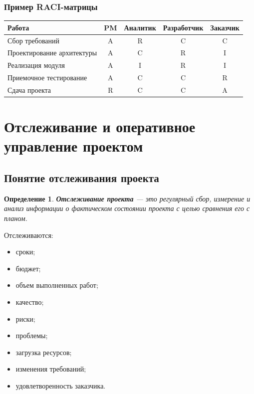 \documentclass[12pt,a4paper]{article}
\newtheorem{definition}{Определение}
\begin{document}
\subsubsection*{Пример RACI-матрицы}

\begin{center}
\begin{tabular}{|p{4cm}|c|c|c|c|}
\hline
\textbf{Работа} & \textbf{PM} & \textbf{Аналитик} & \textbf{Разработчик} & \textbf{Заказчик} \\
\hline
Сбор требований & A & R & C & C \\
\hline
Проектирование архитектуры & A & C & R & I \\
\hline
Реализация модуля & A & I & R & I \\
\hline
Приемочное тестирование & A & C & C & R \\
\hline
Сдача проекта & R & C & C & A \\
\hline
\end{tabular}
\end{center}

\section{Отслеживание и оперативное управление проектом}

\subsection{Понятие отслеживания проекта}

\begin{definition}
\textbf{Отслеживание проекта} --- это регулярный сбор, измерение и анализ информации о фактическом состоянии проекта с целью сравнения его с планом.
\end{definition}

Отслеживаются:
\begin{itemize}
    \item сроки;
    \item бюджет;
    \item объем выполненных работ;
    \item качество;
    \item риски;
    \item проблемы;
    \item загрузка ресурсов;
    \item изменения требований;
    \item удовлетворенность заказчика.
\end{itemize}
\end{document}
